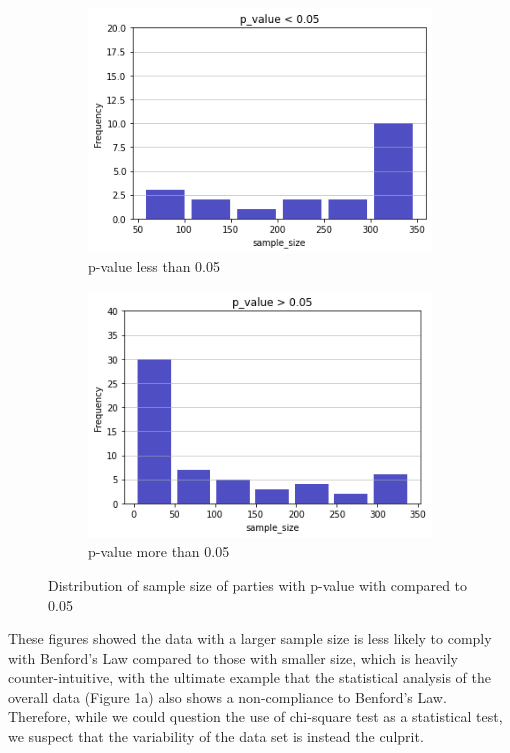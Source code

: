 \documentclass[12pt]{article}
\begin{document}
\begin{figure}[h]
\centering
\begin{subfigure}{.5\textwidth}
  \centering
  \includegraphics[scale=0.4]{p_value_less.png}
  \caption{p-value less than 0.05}
  \label{fig:sub1}
\end{subfigure}%
\begin{subfigure}{.5\textwidth}
  \centering
  \includegraphics[scale=0.4]{p_value_more.png}
  \caption{p-value more than 0.05}
  \label{fig:sub2}
\end{subfigure}
\caption{Distribution of sample size of parties with p-value with compared to 0.05}
\label{fig:test}
\end{figure}


These figures showed the data with a larger sample size is less likely to comply with Benford's Law compared to those with smaller size, which is heavily counter-intuitive, with the ultimate example that the statistical analysis of the overall data (Figure 1a) also shows a non-compliance to Benford's Law. Therefore, while we could question the use of chi-square test as a statistical test, we suspect that the variability of the data set is instead the culprit.
\end{document}
